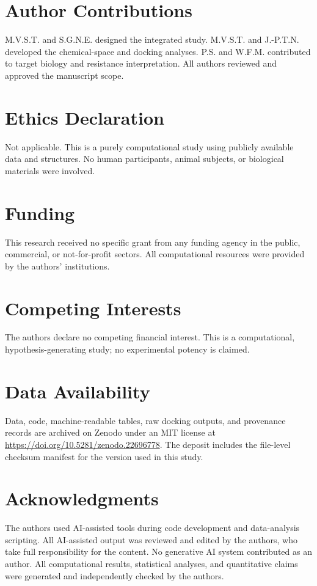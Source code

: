 \documentclass[11pt,a4paper]{article}
\begin{document}
	\section*{Author Contributions}
	M.V.S.T. and S.G.N.E. designed the integrated study. M.V.S.T. and J.-P.T.N. developed the chemical-space and docking analyses. P.S. and W.F.M. contributed to target biology and resistance interpretation. All authors reviewed and approved the manuscript scope.
	
	\section*{Ethics Declaration}
	Not applicable. This is a purely computational study using publicly available data and structures. No human participants, animal subjects, or biological materials were involved.
	
	\section*{Funding}
	This research received no specific grant from any funding agency in the public, commercial, or not-for-profit sectors. All computational resources were provided by the authors' institutions.
	
	\section*{Competing Interests}
	The authors declare no competing financial interest. This is a computational, hypothesis-generating study; no experimental potency is claimed.
	
	\section*{Data Availability}
	Data, code, machine-readable tables, raw docking outputs, and provenance records are archived on Zenodo under an MIT license at \url{https://doi.org/10.5281/zenodo.22696778}. The deposit includes the file-level checksum manifest for the version used in this study.
	
	\section*{Acknowledgments}
	The authors used AI-assisted tools during code development and data-analysis scripting. All AI-assisted output was reviewed and edited by the authors, who take full responsibility for the content. No generative AI system contributed as an author. All computational results, statistical analyses, and quantitative claims were generated and independently checked by the authors.
	
\end{document}
